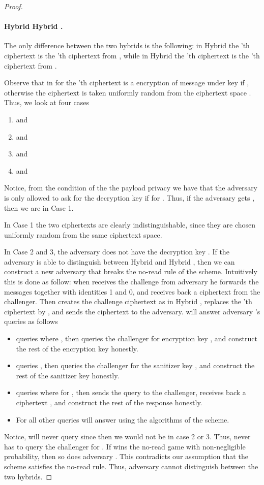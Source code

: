 \documentclass{llncs}
\begin{document}
\begin{proof}
\paragraph{Hybrid   Hybrid .} 
The only difference between the two hybrids is the following: in Hybrid  the 'th \oACE ciphertext is the 'th ciphertext from , while in Hybrid  the 'th \oACE ciphertext is the 'th ciphertext from .

Observe that in  for  the 'th ciphertext is a \oACE encryption of message  under key  if , otherwise the ciphertext is taken uniformly random from the \oACE ciphertext space .
Thus, we look at four cases
\begin{enumerate}
\item  and 
\item  and 
\item  and 
\item  and 
\end{enumerate}

Notice, from the condition of the the payload privacy we have that the adversary is only allowed to ask for the decryption key  if  for . 
Thus, if the adversary gets , then we are in Case 1.

In Case 1 the two ciphertexts are clearly indistinguishable, since they are chosen uniformly random from the same ciphertext space. 

In Case 2 and 3, the adversary does not have the decryption key . If the adversary  is able to distinguish between Hybrid  and Hybrid , then we can construct a new adversary  that breaks the no-read rule of the \oACE scheme. 
Intuitively this is done as follow: when  receives the challenge from adversary  he forwards the messages together with identities 1 and 0, and receives back a \oACE ciphertext  from the \oACE challenger. Then  creates the challenge ciphertext as in Hybrid , replaces the 'th \oACE ciphertext by , and sends the ciphertext to the adversary. 
 will answer adversary 's queries as follows
\begin{itemize}
\item  queries  where , then  queries the challenger for encryption key , and construct the rest of the encryption key  honestly.
\item  queries , then  queries the challenger for the sanitizer key , and construct the rest of the sanitizer key  honestly.
\item  queries  where  for , then  sends the query  to the challenger, receives back a ciphertext , and construct the rest of the response honestly. 
\item For all other queries  will answer using the algorithms of the scheme.
\end{itemize}
Notice,  will never query  since then we would not be in case 2 or 3. Thus,  never has to query the challenger for .
If  wins the no-read game with non-negligible probability, then so does adversary . This contradicts our assumption that the \oACE scheme satisfies the no-read rule. Thus, adversary  cannot distinguish between the two hybrids.







\end{proof}
\end{document}

